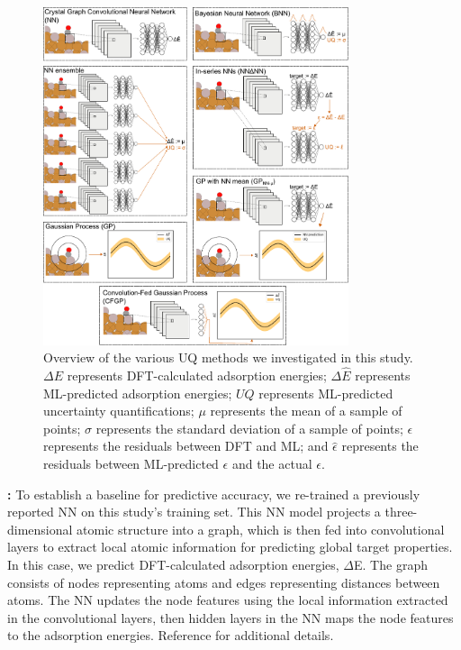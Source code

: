 \documentclass[]{achemso}
\begin{document}
\begin{figure}
    \centering
    \includegraphics[width=0.8\textwidth]{methods/methods.pdf}
    \caption{Overview of the various \gls{UQ} methods we investigated in this study.
    $\Delta E$ represents \gls{DFT}-calculated adsorption energies;
    $\Delta \hat{E}$ represents \gls{ML}-predicted adsorption energies;
    $UQ$ represents \gls{ML}-predicted uncertainty quantifications;
    $\mu$ represents the mean of a sample of points;
    $\sigma$ represents the standard deviation of a sample of points;
    $\epsilon$ represents the residuals between \gls{DFT} and \gls{ML};
    and $\hat{\epsilon}$ represents the residuals between \gls{ML}-predicted $\epsilon$ and the actual $\epsilon$.
    }\label{fig:methods}
\end{figure}

\textbf{:}
To establish a baseline for predictive accuracy, we re-trained a previously reported \gls{NN}\cite{Xie2018, Back2019} on this study's training set.
This \gls{NN} model projects a three-dimensional atomic structure into a graph, which is then fed into convolutional layers to extract local atomic information for predicting global target properties.
In this case, we predict \gls{DFT}-calculated adsorption energies, $\Delta$E.
The graph consists of nodes representing atoms and edges representing distances between atoms. 
The NN updates the node features using the local information extracted in the convolutional layers, then hidden layers in the NN maps the node features to the adsorption energies.
Reference \citet{Back2019} for additional details.
\end{document}
